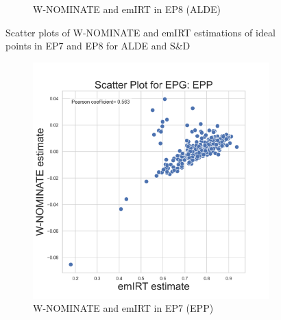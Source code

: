 \documentclass[a4paper,12pt]{report}
\begin{document}
\begin{figure}[H]
\begin{subfigure}[b]{0.48\textwidth}
                        \caption{W-NOMINATE and emIRT in EP8 (ALDE)}
                        \label{fig:WNOMINATE_ALDESCATTER_8}
                    \end{subfigure}
                    \caption
                    {Scatter plots of W-NOMINATE and emIRT estimations of ideal points in EP7 and EP8 for ALDE and S\&D}
                    \label{fig:WNOMINATE_SCATTER_parties}
                \end{figure}

                \begin{figure}[H]
                    \centering
                    \begin{subfigure}[b]{0.48\textwidth}
                        \centering
                        \includegraphics[width=\textwidth]{Graphs/ScatterEMWNOMINATE_7_EPG_EPP}
                        \caption{W-NOMINATE and emIRT in EP7 (EPP)}
                        \label{fig:WNOMINATE_EPP_SCATTER_7}
                    \end{subfigure}
                    \hfill
                    \begin{subfigure}[b]{0.48\textwidth}
                        \centering

\end{subfigure}
\end{figure}
\end{document}
